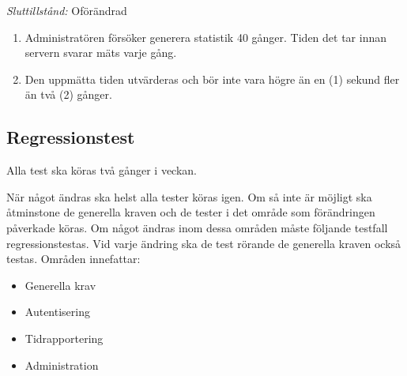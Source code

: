 \documentclass[a4paper]{article}
\begin{document}
\begin{ST}
\emph{Sluttillstånd:} Oförändrad

\begin{enumerate}

\item Administratören försöker generera statistik 40 gånger. Tiden det tar innan servern svarar mäts varje gång.

\item Den uppmätta tiden utvärderas och bör inte vara högre än en (1) sekund fler än två (2) gånger.


\end{enumerate}

\end{ST}

\subsection{Regressionstest}

Alla test ska köras två gånger i veckan.

När något ändras ska helst alla tester köras igen. Om så inte är möjligt ska åtminstone de
generella kraven och de tester i det område som förändringen påverkade köras.
Om något ändras inom dessa områden måste följande testfall regressionstestas. Vid varje
ändring ska de test rörande de generella kraven också testas.
Områden innefattar:

\begin{itemize}

\item
Generella krav

\item
Autentisering

\item
Tidrapportering

\item
Administration

\end{itemize}
\end{document}
